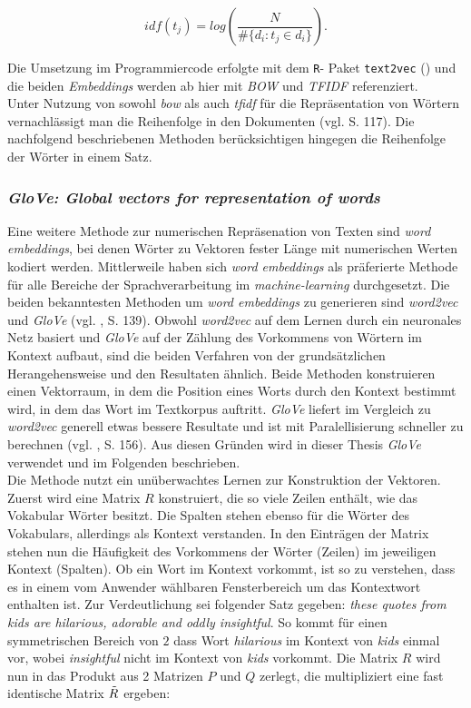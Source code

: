\documentclass[a4paper,11pt]{article}
\begin{document}
\[idf(t_j) = log(\frac{N}{\# \{d_i: t_j \in d_i \}}) .\]

Die Umsetzung im Programmiercode erfolgte mit dem \texttt{R}- Paket \texttt{text2vec} (\cite{text2vec}) und die beiden \textit{Embeddings} werden ab hier mit \textit{BOW} und \textit{TFIDF} referenziert.\\

Unter Nutzung von sowohl \textit{bow} als auch \textit{tfidf} für die Repräsentation von Wörtern vernachlässigt man die Reihenfolge in den Dokumenten (vgl. \cite{deepEssentials} S. 117). 
Die nachfolgend beschriebenen Methoden berücksichtigen hingegen die Reihenfolge der Wörter in einem Satz.


\subsubsection{\textit{GloVe: Global vectors for representation of words}} \label{Kap:Glove}

Eine weitere Methode zur numerischen Repräsenation von Texten sind \textit{word embeddings}, bei denen Wörter zu Vektoren fester Länge mit numerischen Werten kodiert werden. Mittlerweile haben sich \textit{word embeddings} als präferierte Methode für alle Bereiche der Sprachverarbeitung im \textit{machine-learning} durchgesetzt. Die beiden bekanntesten Methoden um \textit{word embeddings} zu generieren sind \textit{word2vec} und \textit{GloVe} (vgl. \cite{keras}, S. 139). Obwohl \textit{word2vec} auf dem Lernen durch ein neuronales Netz basiert und \textit{GloVe} auf der Zählung des Vorkommens von Wörtern im Kontext aufbaut, sind die beiden Verfahren von der grundsätzlichen Herangehensweise und den Resultaten ähnlich. Beide Methoden konstruieren einen Vektorraum, in dem die Position eines Worts durch den Kontext bestimmt wird, in dem das Wort im Textkorpus auftritt.
\textit{GloVe} liefert im Vergleich zu \textit{word2vec} generell etwas bessere Resultate und ist mit Paralellisierung schneller zu berechnen (vgl. \cite{keras}, S. 156). Aus diesen Gründen wird in dieser Thesis \textit{GloVe} verwendet und im Folgenden beschrieben. \\
Die Methode nutzt ein unüberwachtes Lernen zur Konstruktion der Vektoren. Zuerst wird eine Matrix $R$ konstruiert, die so viele Zeilen enthält, wie das Vokabular Wörter besitzt. Die Spalten stehen ebenso für die Wörter des Vokabulars, allerdings als Kontext verstanden. In den Einträgen der Matrix stehen nun die Häufigkeit des Vorkommens der Wörter (Zeilen) im jeweiligen Kontext (Spalten). Ob ein Wort im Kontext vorkommt, ist so zu verstehen, dass es in einem vom Anwender wählbaren Fensterbereich um das Kontextwort enthalten ist. Zur Verdeutlichung sei folgender Satz gegeben: \textit{these quotes from kids are hilarious, adorable and oddly insightful}. So kommt für einen symmetrischen Bereich von $2$ dass Wort \textit{hilarious} im Kontext von \textit{kids} einmal vor, wobei \textit{insightful} nicht im Kontext von \textit{kids} vorkommt. 
Die Matrix $R$ wird nun in das Produkt aus 2 Matrizen $P$ und $Q$ zerlegt, die multipliziert eine fast identische Matrix $\Tilde{R}$ ergeben:
\end{document}
